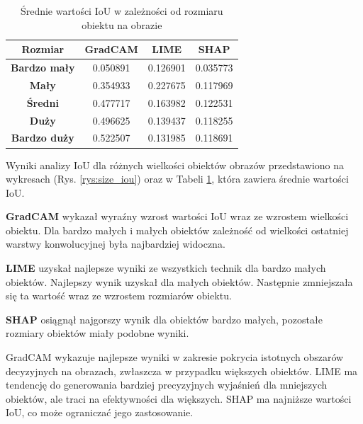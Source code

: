 \begin{table}[h]
	\centering
	\begin{tabular}{|c|c|c|c|}
		\hline
		\textbf{Rozmiar}     & \textbf{GradCAM} & \textbf{LIME} & \textbf{SHAP} \\
		\hline
		\textbf{Bardzo mały} & 0.050891         & 0.126901      & 0.035773      \\
		\hline
		\textbf{Mały}        & 0.354933         & 0.227675      & 0.117969      \\
		\hline
		\textbf{Średni}      & 0.477717         & 0.163982      & 0.122531      \\
		\hline
		\textbf{Duży}        & 0.496625         & 0.139437      & 0.118255      \\
		\hline
		\textbf{Bardzo duży} & 0.522507         & 0.131985      & 0.118691      \\
		\hline
	\end{tabular}
	\caption{Średnie wartości IoU w zależności od rozmiaru obiektu na obrazie}
	\label{tab:size_iou}
\end{table}

Wyniki analizy IoU dla różnych wielkości obiektów obrazów przedstawiono na wykresach (Rys. \ref{rys:size_iou}) oraz w Tabeli \ref{tab:size_iou}, która zawiera średnie wartości IoU.

\textbf{GradCAM} wykazał wyraźny wzrost wartości IoU wraz ze wzrostem wielkości obiektu.
Dla bardzo małych i małych obiektów zależność od wielkości ostatniej warstwy konwolucyjnej była najbardziej widoczna.

\textbf{LIME} uzyskał najlepsze wyniki ze wszystkich technik dla bardzo małych obiektów.
Najlepszy wynik uzyskał dla małych obiektów.
Następnie zmniejszała się ta wartość wraz ze wzrostem rozmiarów obiektu.

\textbf{SHAP} osiągnął najgorszy wynik dla obiektów bardzo małych, pozostałe rozmiary obiektów miały podobne wyniki.

GradCAM wykazuje najlepsze wyniki w zakresie pokrycia istotnych obszarów decyzyjnych na obrazach, zwłaszcza w przypadku większych obiektów.
LIME ma tendencję do generowania bardziej precyzyjnych wyjaśnień dla mniejszych obiektów, ale traci na efektywności dla większych.
SHAP ma najniższe wartości IoU, co może ograniczać jego zastosowanie.

\vspace{1cm}



